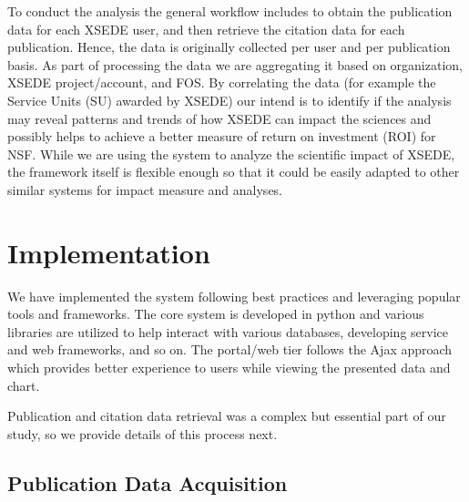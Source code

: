 \documentclass{sig-alternate}
\begin{document}
To conduct the analysis the general workflow includes to obtain the publication data for each XSEDE user, and then retrieve the citation data for each publication. Hence, the data is originally collected per user and per publication basis. As part of processing the data we are aggregating it based on organization, XSEDE project/account, and FOS. By correlating the data (for example the Service Units (SU) awarded by XSEDE) our intend is to identify if the analysis may reveal patterns and trends of how XSEDE can impact the sciences and possibly helps to achieve a better measure of return on investment (ROI) for NSF.  While we are using the system to analyze the scientific impact of XSEDE, the framework itself is flexible enough so that it could be easily adapted to other similar systems for impact measure and analyses.  \section{Implementation} \label{S:implementation} We have implemented the system following best practices and leveraging popular tools and frameworks. The core system is developed in python and various libraries are utilized to help interact with various databases, developing service and web frameworks, and so on. The portal/web tier follows the Ajax approach which provides better experience to users while viewing the presented data and chart.

Publication and citation data retrieval was a complex but essential part of our study, so we provide details of this process next.
  
\subsection{Publication Data Acquisition} 
 
\end{document}
